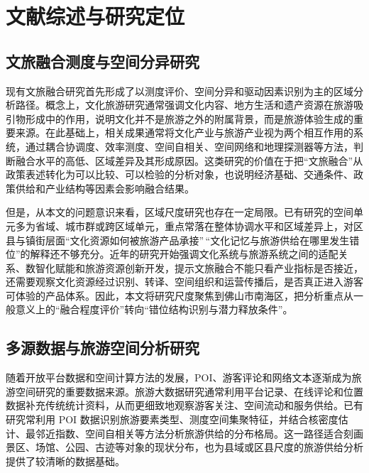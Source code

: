 \chapter{文献综述与研究定位}\label{ux6587ux732eux7efcux8ff0ux4e0eux7814ux7a76ux5b9aux4f4d}

\section{文旅融合测度与空间分异研究}\label{ux6587ux65c5ux878dux5408ux6d4bux5ea6ux4e0eux7a7aux95f4ux5206ux5f02ux7814ux7a76}

现有文旅融合研究首先形成了以测度评价、空间分异和驱动因素识别为主的区域分析路径。概念上，文化旅游研究通常强调文化内容、地方生活和遗产资源在旅游吸引物形成中的作用，说明文化并不是旅游之外的附属背景，而是旅游体验生成的重要来源\cite{ref22,ref23}。在此基础上，相关成果通常将文化产业与旅游产业视为两个相互作用的系统，通过耦合协调度、效率测度、空间自相关、空间网络和地理探测器等方法，判断融合水平的高低、区域差异及其形成原因\cite{ref1,ref11,ref12,ref13,ref14}。这类研究的价值在于把``文旅融合''从政策表述转化为可以比较、可以检验的分析对象，也说明经济基础、交通条件、政策供给和产业结构等因素会影响融合结果。

但是，从本文的问题意识来看，区域尺度研究也存在一定局限。已有研究的空间单元多为省域、城市群或跨区域单元，重点常落在整体协调水平和区域差异上，对区县与镇街层面``文化资源如何被旅游产品承接''\,``文化记忆与旅游供给在哪里发生错位''的解释还不够充分。近年的研究开始强调文化系统与旅游系统之间的适配关系、数智化赋能和旅游资源创新开发，提示文旅融合不能只看产业指标是否接近，还需要观察文化资源经过识别、转译、空间组织和运营传播后，是否真正进入游客可体验的产品体系\cite{ref2,ref15,ref16,ref17,ref18}。因此，本文将研究尺度聚焦到佛山市南海区，把分析重点从一般意义上的``融合程度评价''转向``错位结构识别与潜力释放条件''。

\section{多源数据与旅游空间分析研究}\label{ux591aux6e90ux6570ux636eux4e0eux65c5ux6e38ux7a7aux95f4ux5206ux6790ux7814ux7a76}

随着开放平台数据和空间计算方法的发展，POI、游客评论和网络文本逐渐成为旅游空间研究的重要数据来源。旅游大数据研究通常利用平台记录、在线评论和位置数据补充传统统计资料，从而更细致地观察游客关注、空间流动和服务供给\cite{ref24,ref25}。已有研究常利用 POI 数据识别旅游要素类型、测度空间集聚特征，并结合核密度估计、最邻近指数、空间自相关等方法分析旅游供给的分布格局\cite{ref3,ref4}。这一路径适合刻画景区、场馆、公园、古迹等对象的现状分布，也为县域或区县尺度的旅游供给分析提供了较清晰的数据基础。

